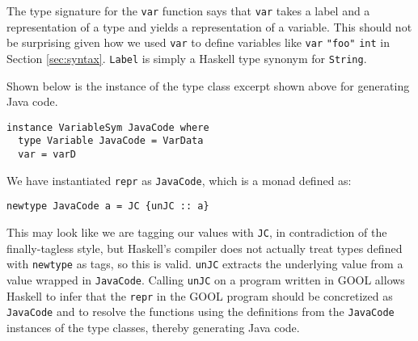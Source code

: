 \documentclass[sigplan,review,anonymous,prologue,dvipsnames]{acmart}
\begin{document}
The type signature for the \verb|var| function says that \verb|var| takes a 
label and a representation of a type and yields a representation of a variable. 
This should not be surprising given how we used \verb|var| to define variables 
like \verb|var| \verb|"foo"| \verb|int| in Section \ref{sec:syntax}. \verb|Label| 
is simply a Haskell type synonym for \verb|String|. 

Shown below is the instance of the type class excerpt shown above for 
generating Java code. 
\begin{lstlisting}
instance VariableSym JavaCode where
  type Variable JavaCode = VarData
  var = varD
\end{lstlisting}
We have instantiated \verb|repr| as \verb|JavaCode|, which is a monad defined 
as:
\begin{lstlisting}
newtype JavaCode a = JC {unJC :: a}
\end{lstlisting}
This may look like we are tagging our values with \verb|JC|, in contradiction 
of the finally-tagless style, but Haskell's compiler does not actually treat 
types defined with \verb|newtype| as tags, so this is valid. \verb|unJC| 
extracts the underlying value from a value wrapped in \verb|JavaCode|. Calling 
\verb|unJC| on a program written in GOOL allows Haskell to infer that the 
\verb|repr| in the GOOL program should be concretized as \verb|JavaCode| and to 
resolve the functions using the definitions from the \verb|JavaCode| instances 
of the type classes, thereby generating Java code.
\end{document}
